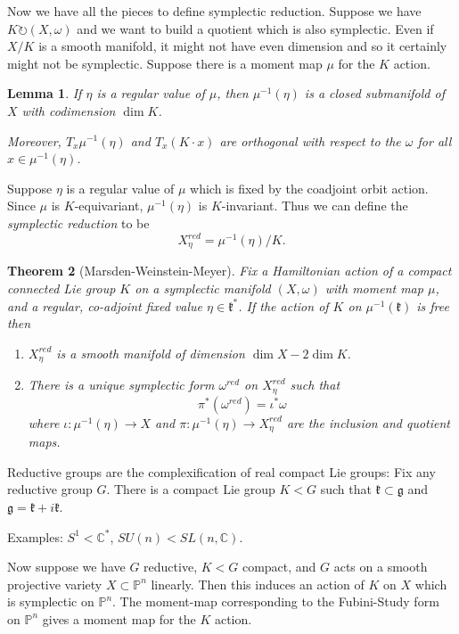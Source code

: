 \documentclass{article}
\newtheorem{theorem}{Theorem}
\newtheorem{lemma}[theorem]{Lemma}
\theoremstyle{definition}
\theoremstyle{remark}
\numberwithin{theorem}{section}
\newcommand{\C}{\mathbb{C}}
\newcommand{\bP}{\mathbb{P}}
\newcommand{\fk}{\mathfrak{k}}
\newenvironment{thm}{
\begin{mdframed}
	\vspace{-0.5em}
	\begin{theorem}
}{
	\end{theorem}
\end{mdframed}
}
\begin{document}
		Now we have all the pieces to define symplectic reduction. Suppose we have $K\circlearrowright (X,\omega)$ and we want to build a quotient which is also symplectic. Even if $X/K$ is a smooth manifold, it might not have even dimension and so it certainly might not be symplectic. Suppose there is a moment map $\mu$ for the $K$ action.
		\begin{lemma}
			If $\eta$ is a regular value of $\mu$, then $\mu^{-1}(\eta)$ is a closed submanifold of $X$ with codimension $\dim K$. \vspace{1em}
			
			Moreover, $T_x\mu^{-1}(\eta)$ and $T_x(K\cdot x)$ are orthogonal with respect to the $\omega$ for all $x\in \mu^{-1}(\eta)$.
		\end{lemma}
			Suppose $\eta$ is a regular value of $\mu$ which is fixed by the coadjoint orbit action. Since $\mu$ is $K$-equivariant, $\mu^{-1}(\eta)$ is $K$-invariant. Thus we can define the \emph{symplectic reduction} to be
			\begin{equation}
				X_\eta^{red} = \mu^{-1}(\eta)/K. 
			\end{equation}
			\begin{thm}[Marsden-Weinstein-Meyer]
				Fix a Hamiltonian action of a compact connected Lie group $K$ on a symplectic manifold $(X,\omega)$ with moment map $\mu$, and a regular, co-adjoint fixed value $\eta \in \fk^\ast$. If the action of $K$ on $\mu^{-1}(\fk)$ is free then
				\begin{enumerate}
					\item $X_\eta^{red}$ is a smooth manifold of dimension $\dim X - 2\dim K$.
					\item There is a unique symplectic form $\omega^{red}$ on $X_\eta^{red}$ such that
					$$\pi^\ast(\omega^{red}) = \iota^\ast \omega$$
					where $\iota:\mu^{-1}(\eta)\to X$ and $\pi:\mu^{-1}(\eta)\to X_\eta^{red}$ are the inclusion and quotient maps.
				\end{enumerate}
			\end{thm}
			
			Reductive groups are the complexification of real compact Lie groups: Fix any reductive group $G$. There is a compact Lie group $K<G$ such that $\fk \subset \mathfrak{g}$ and $\mathfrak{g} = \fk+ i\fk$. 
			
			\noindent Examples: $S^1 < \C^\ast$, $SU(n)<SL(n,\C)$.			
			
			Now suppose we have $G$ reductive, $K<G$ compact, and $G$ acts on a smooth projective variety $X\subset \bP^n$ linearly. Then this induces an action of $K$ on $X$ which is symplectic on $\bP^n$. The moment-map corresponding to the Fubini-Study form on $\bP^n$ gives a moment map for the $K$ action.
			
\end{document}
